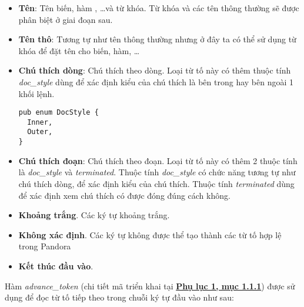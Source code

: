 \begin{itemize}
\begin{itemize}
    \end{itemize}
  \item \textbf{Tên}: Tên biến, hàm , \dots\space và từ khóa. Từ khóa và các tên thông thường sẽ được phân biệt ở giai đoạn sau.
  \item \textbf{Tên thô}: Tương tự như tên thông thường nhưng ở đây ta có thể sử dụng từ khóa để đặt tên cho biến, hàm, \dots
  \item \textbf{Chú thích dòng}: Chú thích theo dòng. 
        Loại từ tố này có thêm thuộc tính \textit{doc\_style} dùng để xác định kiểu của chú thích là bên trong hay bên ngoài 1 khối lệnh.
\begin{lstlisting}[]
pub enum DocStyle {
  Inner,
  Outer,
}
\end{lstlisting}
  \item \textbf{Chú thích đoạn}:  Chú thích theo đoạn. 
        Loại từ tố này có thêm 2 thuộc tính là \textit{doc\_style} và \textit{terminated}. Thuộc tính \textit{doc\_style} có chức năng tương tự như chú thích dòng, để xác định kiểu của chú thích. Thuộc tính \textit{terminated} dùng để xác định xem chú thích có được đóng đúng cách không.
  \item \textbf{Khoảng trắng}. Các ký tự khoảng trắng.
  \item \textbf{Không xác định}. Các ký tự không được thể tạo thành các từ tố hợp lệ trong Pandora
  \item \textbf{Kết thúc đầu vào}.
\end{itemize}

Hàm \textit{advance\_token} (chi tiết mã triển khai tại \hyperref[ap1:simple_token_advance_token]{\bf Phụ lục 1, mục 1.1.1}) được sử dụng để đọc từ tố tiếp theo trong chuỗi ký tự đầu vào như sau:


